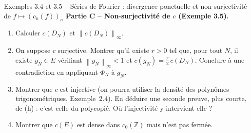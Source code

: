 \documentclass[11pt,a4paper]{article}
\newcommand{\Z}{\mathbb{Z}}
\newcommand{\norm}[1]{\left\|#1\right\|}
\theoremstyle{definition}
\begin{document}
\begin{exo}{Exemples 3.4 et 3.5 -- Séries de Fourier : divergence ponctuelle et non-surjectivité de $f\mapsto(c_n(f))_n$}
\noindent\textbf{Partie C -- Non-surjectivité de $c$ (Exemple 3.5).}
\begin{enumerate}[label=(\alph*),resume]
  \item Calculer $c(D_N)$ et $\norm{c(D_N)}_\infty$.
  \item On suppose $c$ surjective. Montrer qu'il existe $r>0$ tel que, pour tout $N$, il existe $g_N\in E$ vérifiant $\norm{g_N}_\infty<1$ et $c(g_N)=\tfrac r2\,c(D_N)$. Conclure à une contradiction en appliquant $\Phi_N$ à $g_N$.
  \item Montrer que $c$ est injective (on pourra utiliser la densité des polynômes trigonométriques, Exemple~2.4). En déduire une seconde preuve, plus courte, de (h) : c'est celle du polycopié. Où l'injectivité y intervient-elle ?
  \item Montrer que $c(E)$ est dense dans $c_0(\Z)$ mais n'est pas fermée.
\end{enumerate}
\end{exo}
\end{document}

